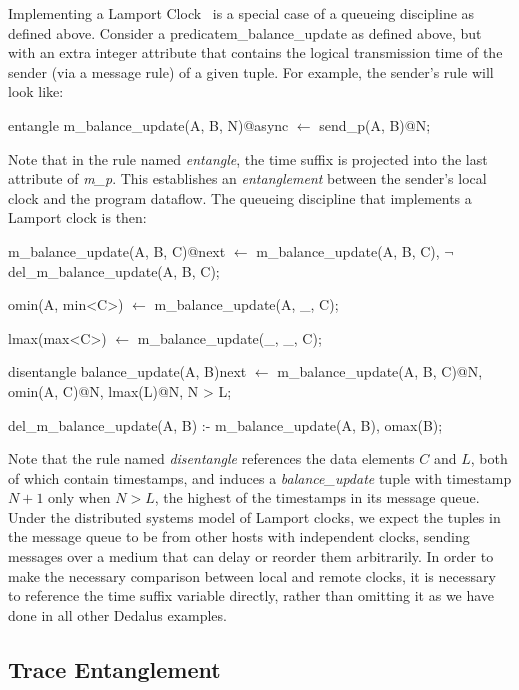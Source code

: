 Implementing a Lamport Clock~\cite{timeclocks} is a special case of a queueing discipline as defined above.
Consider a predicate{m\_balance\_update} as defined above, but with an extra integer attribute that contains the logical transmission
time of the sender (via a message rule) of a given tuple.  For example, the sender's rule will look like: 


\begin{Dedalus}
entangle
m\_balance\_update(A, B, N)@async \(\leftarrow\)
  send\_p(A, B)@N;
\end{Dedalus}

Note that in the rule named \emph{entangle}, the time suffix is projected into the last attribute of \emph{m\_p}.  
This establishes an \emph{entanglement} between
the sender's local clock and the program dataflow.  The queueing discipline that implements a
Lamport clock is then:

\begin{Dedalus}

m\_balance\_update(A, B, C)@next \(\leftarrow\)
  m\_balance\_update(A, B, C),
  \(\lnot\) del\_m\_balance\_update(A, B, C);

omin(A, min<C>) \(\leftarrow\)
  m\_balance\_update(A, _, C);

lmax(max<C>) \(\leftarrow\)
  m\_balance\_update(_, _, C);

disentangle
balance_update(A, B)next \(\leftarrow\)
  m\_balance\_update(A, B, C)@N,
  omin(A, C)@N,
  lmax(L)@N,
  N > L;

del\_m\_balance\_update(A, B) :-
  m\_balance\_update(A, B),
  omax(B);
  
\end{Dedalus}

Note that the rule named \emph{disentangle} references the data elements $C$ and $L$, both of which
contain timestamps, and induces a \emph{balance\_update} tuple with timestamp $N+1$ only when $N > L$,
the highest of the timestamps in its message queue.  Under the distributed systems model of Lamport clocks, 
we expect the tuples in the message queue to  be from other hosts with independent clocks, sending messages 
over a medium that can delay or reorder them arbitrarily.  In order to make the necessary comparison between local
and remote clocks, it is necessary to reference the time suffix variable directly, rather than omitting it as we have done 
in all other Dedalus examples.

\subsection{Trace Entanglement}


